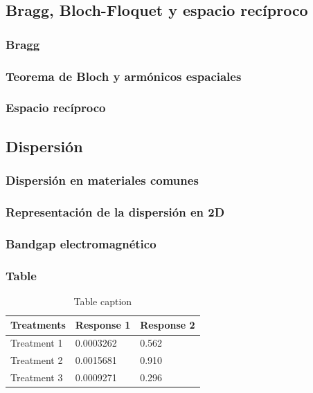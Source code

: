 \documentclass{beamer}
\begin{document}
	\subsection{Bragg, Bloch-Floquet y espacio recíproco}
	
		\begin{frame}
		\frametitle{Bragg}
		\end{frame}
	
		\begin{frame}
		\frametitle{Teorema de Bloch y armónicos espaciales}
		\end{frame}
	
		\begin{frame}
		\frametitle{Espacio recíproco}
		\end{frame}
	
	\subsection{Dispersión}
	
		\begin{frame}
		\frametitle{Dispersión en materiales comunes}
		\end{frame}
	
		\begin{frame}
		\frametitle{Representación de la dispersión en 2D}
		\end{frame}
	
		\begin{frame}
		\frametitle{Bandgap electromagnético}
		\end{frame}

\begin{frame}
\frametitle{Table}
\begin{table}
\begin{tabular}{l l l}
\toprule
\textbf{Treatments} & \textbf{Response 1} & \textbf{Response 2}\\
\midrule
Treatment 1 & 0.0003262 & 0.562 \\
Treatment 2 & 0.0015681 & 0.910 \\
Treatment 3 & 0.0009271 & 0.296 \\
\bottomrule
\end{tabular}
\caption{Table caption}
\end{table}
\end{frame}

\end{document}
